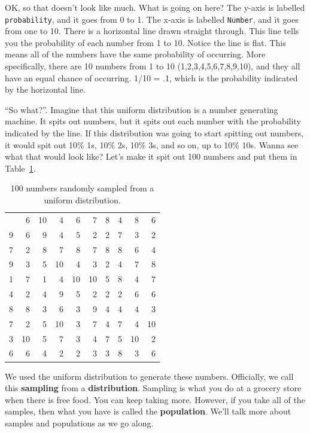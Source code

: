 \documentclass[
  letterpaper,
  DIV=11,
  numbers=noendperiod]{scrreprt}
\begin{document}
OK, so that doesn't look like much. What is going on here? The y-axis is
labelled \texttt{probability}, and it goes from 0 to 1. The x-axis is
labelled \texttt{Number}, and it goes from one to 10. There is a
horizontal line drawn straight through. This line tells you the
probability of each number from 1 to 10. Notice the line is flat. This
means all of the numbers have the same probability of occurring. More
specifically, there are 10 numbers from 1 to 10 (1,2,3,4,5,6,7,8,9,10),
and they all have an equal chance of occurring. 1/10 = .1, which is the
probability indicated by the horizontal line.

``So what?''. Imagine that this uniform distribution is a number
generating machine. It spits out numbers, but it spits out each number
with the probability indicated by the line. If this distribution was
going to start spitting out numbers, it would spit out 10\% 1s, 10\% 2s,
10\% 3s, and so on, up to 10\% 10s. Wanna see what that would look like?
Let's make it spit out 100 numbers and put them in
Table~\ref{tbl-5100rand}.

\begin{longtable}[]{@{}rrrrrrrrrr@{}}

\caption{\label{tbl-5100rand}100 numbers randomly sampled from a uniform
distribution.}

\tabularnewline

\toprule\noalign{}
\endhead
\bottomrule\noalign{}
\endlastfoot
8 & 6 & 10 & 4 & 6 & 7 & 8 & 4 & 8 & 6 \\
9 & 6 & 9 & 4 & 5 & 2 & 2 & 7 & 3 & 2 \\
7 & 2 & 8 & 7 & 8 & 7 & 8 & 8 & 6 & 4 \\
9 & 3 & 5 & 10 & 4 & 3 & 2 & 4 & 7 & 8 \\
1 & 7 & 1 & 4 & 10 & 10 & 5 & 8 & 4 & 7 \\
4 & 2 & 4 & 9 & 5 & 2 & 2 & 2 & 6 & 6 \\
8 & 8 & 3 & 6 & 3 & 9 & 4 & 4 & 4 & 3 \\
7 & 2 & 5 & 10 & 3 & 7 & 4 & 7 & 4 & 10 \\
3 & 10 & 5 & 7 & 3 & 4 & 7 & 5 & 10 & 2 \\
6 & 6 & 4 & 2 & 2 & 3 & 3 & 8 & 3 & 6 \\

\end{longtable}

We used the uniform distribution to generate these numbers. Officially,
we call this \textbf{sampling} from a \textbf{distribution}. Sampling is
what you do at a grocery store when there is free food. You can keep
taking more. However, if you take all of the samples, then what you have
is called the \textbf{population}. We'll talk more about samples and
populations as we go along.
\end{document}
